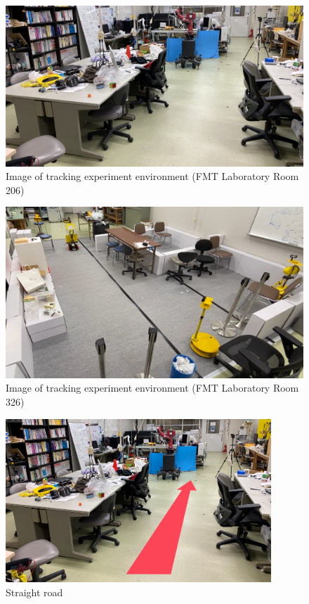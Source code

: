 \begin{figure}[h]
  \begin{center}
  \includegraphics[width=150mm,clip]{figure/experimental_env1.JPG}
  \caption{Image of tracking experiment environment (FMT Laboratory Room 206)}
  \label{Image of tracking experiment environment (FMT Laboratory Room 206)}
  \end{center}
\end{figure}

\begin{figure}[h]
  \begin{center}
  \includegraphics[width=150mm,clip]{figure/experimental_env2.png}
  \caption{Image of tracking experiment environment (FMT Laboratory Room 326)}
  \label{Image of tracking experiment environment (FMT Laboratory Room 326)}
  \end{center}
\end{figure}

\begin{figure}[h]
  \begin{center}
  \includegraphics[width=100mm,clip]{figure/Straight.PNG}
  \caption{Straight road}
  \label{Straight road}
  \end{center}
\end{figure}

